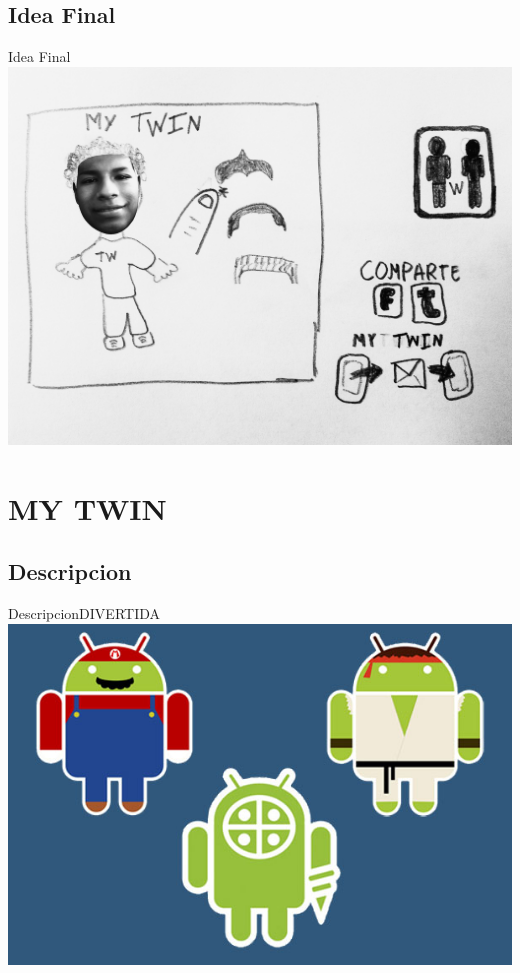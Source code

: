 \documentclass{beamer}
\begin{document}
\subsection{Idea Final}

\begin{frame}{Idea Final}
\center
\includegraphics[scale=0.09]{idea.jpg}

\end{frame}




\section{MY TWIN}

\subsection{Descripcion}

\begin{frame}{Descripcion}{DIVERTIDA}
   \includegraphics[scale=0.5]{442.jpg}
\end{frame}
\end{document}

